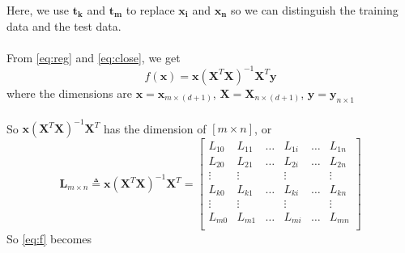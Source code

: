 \documentclass{article}
\begin{document}
       	Here, we use $\boldsymbol{t_k}$ and $\boldsymbol{t_m}$ to replace $\boldsymbol{x_i}$ and $\boldsymbol{x_n}$ so we can distinguish the training data and the test data.\\\\
       	From \eqref{eq:reg} and \eqref{eq:close}, we  get
       	\begin{equation}\label{eq:f}
            f(\boldsymbol{x}) = \boldsymbol{x} (\boldsymbol{X}^T\boldsymbol{X})^{-1}\boldsymbol{X}^T\boldsymbol{y}
       	\end{equation}
       	where the dimensions are $\boldsymbol{x}=\boldsymbol{x}_{m\times (d+1)}$, $\boldsymbol{X}=\boldsymbol{X}_{n\times (d+1)}$, $\boldsymbol{y}=\boldsymbol{y}_{n\times1}$\\\\ 
       	So $\boldsymbol{x} (\boldsymbol{X}^T\boldsymbol{X})^{-1}\boldsymbol{X}^T$ has the dimension of $[m\times n]$, or
       	\begin{equation}
       		\boldsymbol{L}_{m\times n}\triangleq\boldsymbol{x} (\boldsymbol{X}^T\boldsymbol{X})^{-1}\boldsymbol{X}^T=
       			\begin{bmatrix} 
       			L_{10}&L_{11}&\dots&L_{1i}&\dots&L_{1n}\\
    			L_{20}&L_{21}&\dots&L_{2i}&\dots&L_{2n}\\
    			\vdots&\vdots&     &\vdots&     &\vdots\\
    			L_{k0}&L_{k1}&\dots&L_{ki}&\dots&L_{kn}\\
    			\vdots&\vdots&     &\vdots&     &\vdots\\
    			L_{m0}&L_{m1}&\dots&L_{mi}&\dots&L_{mn}\\
    			\end{bmatrix}
		\end{equation}       
		So \eqref{eq:f} becomes
\end{document}
